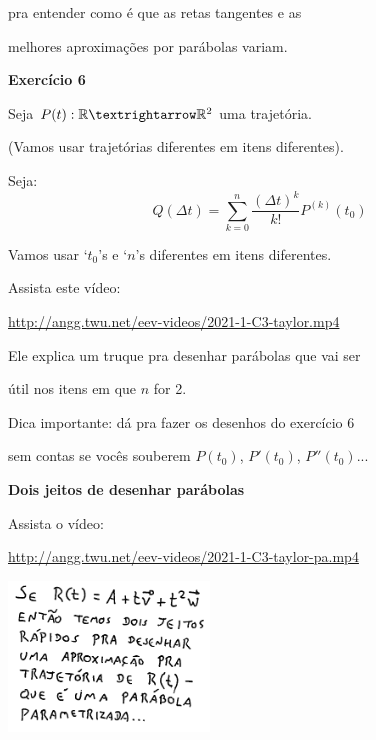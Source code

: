 \documentclass[oneside,12pt]{article}
\begin{document}
pra entender como é que as retas tangentes e as

melhores aproximações por parábolas variam.

\newpage


{\bf Exercício 6}

\ssk

Seja $P(t):\R→\R^2$ uma trajetória.

(Vamos usar trajetórias diferentes em itens diferentes).

Seja:
%
$$Q(Δt) = \sum_{k=0}^n \frac{(Δt)^k}{k!} P^{(k)}(t_0)$$

Vamos usar `$t_0$'s e `$n$'s diferentes em itens diferentes.

\msk

Assista este vídeo:

\ssk

{\footnotesize

\url{http://angg.twu.net/eev-videos/2021-1-C3-taylor.mp4}

}

Ele explica um truque pra desenhar parábolas que vai ser

útil nos itens em que $n$ for 2.

\msk

Dica importante: dá pra fazer os desenhos do exercício 6

sem contas se vocês souberem $P(t_0)$, $P'(t_0)$, $P''(t_0)$...



\newpage

{\bf Dois jeitos de desenhar parábolas}

\msk

Assista o vídeo:

{\footnotesize

\url{http://angg.twu.net/eev-videos/2021-1-C3-taylor-pa.mp4}

}

\bsk

\includegraphics[height=4cm]{2021-1-C3/20210707_metodo_parabola_0.pdf}
\end{document}
